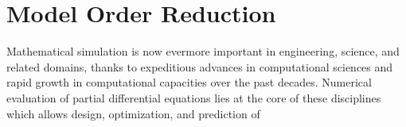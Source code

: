 \chapter{Model Order Reduction} \label{chapter:3}
Mathematical simulation is now evermore important in engineering, science, and related domains, thanks to expeditious advances in computational sciences and rapid growth in computational capacities over the past decades. Numerical evaluation of partial differential equations lies at the core of these disciplines which allows design, optimization, and prediction of 

